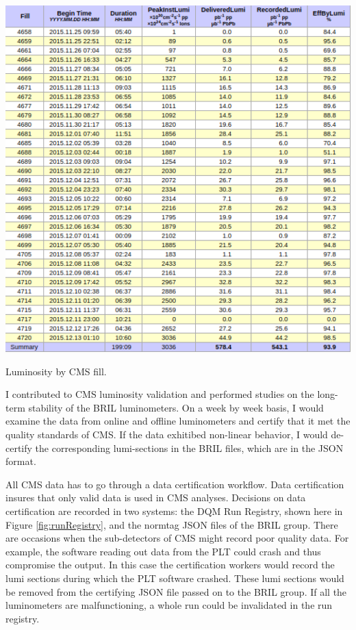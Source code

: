 \begin{table}[h!]
\begin{centering}
\includegraphics[width=5.5in]{Chapter4/importfigs/lumiFill.png}
\par\end{centering}
\caption{Luminosity by CMS fill. \label{fig:lumiFill}}
\end{table}

I contributed to CMS luminosity validation and performed studies on the long-term stability of the BRIL luminometers. On a week by week basis, I would examine the data from online and offline luminometers and certify that it met the quality standards of CMS. If the data exhitibed non-linear behavior, I would de-certify the corresponding lumi-sections in the BRIL files, which are in the JSON format.

All CMS data has to go through a data certification workflow. Data certification insures that only valid data is used in CMS analyses. Decisions on data certification are recorded in two systems: the DQM Run Registry, shown here in Figure \ref{fig:runRegistry}, and the normtag JSON files of the BRIL group. There are occasions when the sub-detectors of CMS might record poor quality data. For example, the software reading out data from the PLT could crash and thus compromise the output. In this case the certification workers would record the lumi sections during which the PLT software crashed. These lumi sections would be removed from the certifying JSON file passed on to the BRIL group. If all the luminometers are malfunctioning, a whole run could be invalidated in the run registry.

